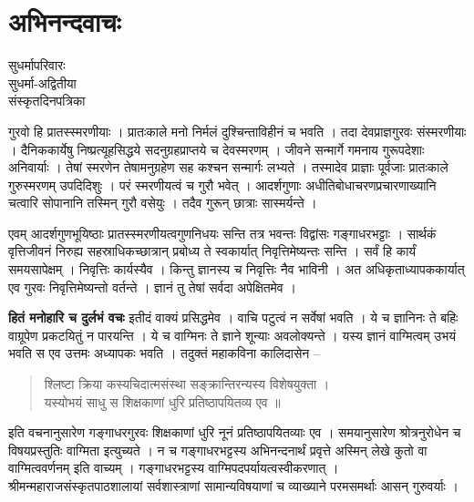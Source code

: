 \chapter{अभिनन्दवाचः}

\begin{center}
\smallskip

  
सुधर्मापरिवारः\\
सुधर्मा-अद्वितीया\\ 
संस्कृतदिनपत्रिका
\end{center}

गुरवो हि प्रातस्स्मरणीयाः । प्रातःकाले मनो निर्मलं दुश्चिन्ताविहीनं च भवति । तदा देवप्राज्ञगुरवः संस्मरणीयाः । दैनिककार्येषु निष्प्रत्यूहसिद्धये सदनुग्रहप्राप्तये च देवस्मरणम् । जीवने सन्मार्गे गमनाय गुरूपदेशाः अनिवार्याः । तेषां स्मरणेन तेषामनुग्रहेण सह कश्चन सन्मार्गः लभ्यते । तस्मादेव प्राज्ञाः पूर्वजाः प्रातःकाले गुरुस्मरणम् उपदिदिशुः । परं स्मरणीयत्वं च गुरौ भवेत् । आदर्शगुणाः अधीतिबोधाचरणप्रचारणाख्यानि चत्वारि सोपानानि तस्मिन् गुरौ वसेयुः । तदैव गुरून् छात्राः सास्मर्यन्ते । 

एवम् आदर्शगुणभूयिष्ठाः प्रातस्स्मरणीयत्वगुणनिधयः सन्ति तत्र भवन्तः विद्वांसः गङ्गाधरभट्टाः । सार्थकं वृत्तिजीवनं निरुह्य सहस्राधिकच्छात्रान् प्रबोध्य ते स्वकार्यात् निवृत्तिमेष्यन्तः सन्ति । सर्वं हि कार्यं समयसापेक्षम् । निवृत्तिः कार्यस्यैव । किन्तु ज्ञानस्य च निवृत्तिः नैव भाविनी । अत अधिकृताध्यापककार्यात् एव गुरवः निवृत्तिमेष्यन्तो वर्तन्ते । ज्ञानं तु तेषां सर्वदा अपेक्षितमेव ।

\textbf{हितं मनोहारि च दुर्लभं वचः} इतीदं वाक्यं प्रसिद्धमेव । वाचि पटुत्वं न सर्वेषां भवति । ये च ज्ञानिनः ते बहिः वाग्रूपेण प्रकटयितुं न पारयन्ति । ये च वाग्मिनः ते ज्ञाने शून्याः अवलोक्यन्ते । यस्य ज्ञानं वाग्मित्वम् उभयं भवति स एव उत्तमः अध्यापकः भवति । तदुक्तं महाकविना कालिदासेन --

\begin{verse}
श्लिष्टा क्रिया कस्यचिदात्मसंस्था सङ्क्रान्तिरन्यस्य विशेषयुक्ता ।\\
यस्योभयं साधु स शिक्षकाणां धुरि प्रतिष्ठापयितव्य एव ॥
\end{verse}

इति वचनानुसारेण गङ्गाधरगुरवः शिक्षकाणां धुरि नूनं प्रतिष्ठापयितव्याः एव । समयानुसारेण श्रोत्रनुरोधेन च विषयप्रस्तुतिः वाग्मिता इत्युच्यते । न च गङ्गाधरभट्टस्य अभिनन्दनार्थं प्रवृत्ते अस्मिन् लेखे कुतो वा वाग्मित्ववर्णनम् इति वाच्यम् । गङ्गाधरभट्टस्य वाग्मिपदपर्यायत्वस्वीकरणात् । श्रीमन्महाराजसंस्कृतपाठशालायां सर्वशास्त्राणां सामान्यविषयाणां च व्याख्याने परमसमर्थाः आसन् गुरुवर्याः । 

